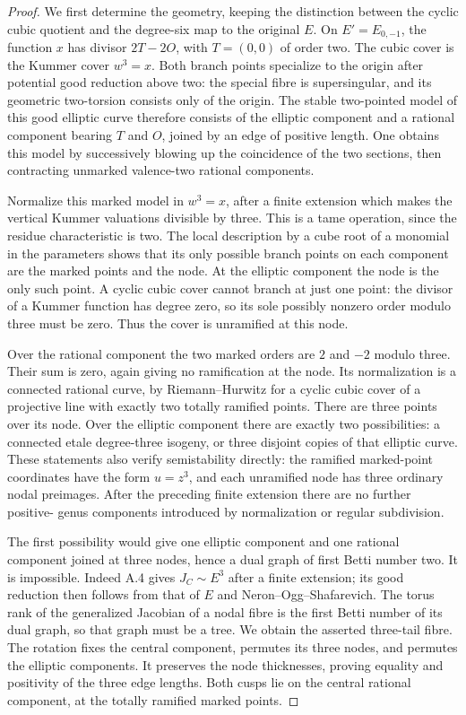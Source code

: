 \begin{proof}
We first determine the geometry, keeping the distinction between the
cyclic cubic quotient and the degree-six map to the original $E$.
On $E'=E_{0,-1}$, the function $x$ has divisor $2T-2O$, with
$T=(0,0)$ of order two. The cubic cover is the Kummer cover $w^3=x$.
Both branch points specialize to the origin after potential good
reduction above two: the special fibre is supersingular, and its
geometric two-torsion consists only of the origin. The stable
two-pointed model of this good elliptic curve therefore consists of
the elliptic component and a rational component bearing $T$ and $O$,
joined by an edge of positive length. One obtains this model by
successively blowing up the coincidence of the two sections, then
contracting unmarked valence-two rational components.

Normalize this marked model in $w^3=x$, after a finite extension
which makes the vertical Kummer valuations divisible by three.
This is a tame operation, since the residue characteristic is two.
The local description by a cube root of a monomial in the parameters
shows that its only possible branch points on each component are the
marked points and the node. At the elliptic component the node is the
only such point. A cyclic cubic cover cannot branch at just one
point: the divisor of a Kummer function has degree zero, so its sole
possibly nonzero order modulo three must be zero. Thus the cover is
unramified at this node.

Over the rational component the two marked orders are $2$ and $-2$
modulo three. Their sum is zero, again giving no ramification at
the node. Its normalization is a connected rational curve, by
Riemann--Hurwitz for a cyclic cubic cover of a projective line with
exactly two totally ramified points. There are three points over its
node. Over the elliptic component there are exactly two possibilities:
a connected etale degree-three isogeny, or three disjoint copies of
that elliptic curve. These statements also verify semistability
directly: the ramified marked-point coordinates have the form
$u=z^3$, and each unramified node has three ordinary nodal preimages.
After the preceding finite extension there are no further positive-
genus components introduced by normalization or regular subdivision.

The first possibility would give one elliptic component and one
rational component joined at three nodes, hence a dual graph of
first Betti number two. It is impossible. Indeed A.4 gives
$J_C\sim E^3$ after a finite extension; its good reduction then
follows from that of $E$ and Neron--Ogg--Shafarevich. The torus rank
of the generalized Jacobian of a nodal fibre is the first Betti
number of its dual graph, so that graph must be a tree. We obtain
the asserted three-tail fibre. The rotation fixes the central
component, permutes its three nodes, and permutes the elliptic
components. It preserves the node thicknesses, proving equality
and positivity of the three edge lengths. Both cusps lie on the
central rational component, at the totally ramified marked points.


\end{proof}
